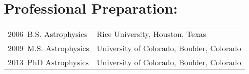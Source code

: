 \documentclass[12pt]{article}
\begin{document}





\section*{Professional Preparation: }
\begin{tabular} {ll}
    2006~B.S. Astrophysics & Rice University, Houston, Texas \\
    2009~M.S. Astrophysics & University of Colorado, Boulder, Colorado \\
    2013~PhD Astrophysics & University of Colorado, Boulder, Colorado \\
\end{tabular}




\setlength{\extrarowheight}{2pt}
\end{document}
